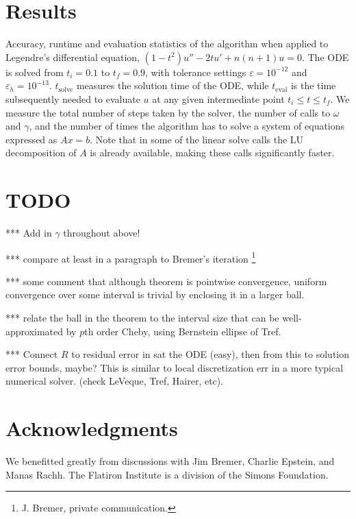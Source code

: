 \documentclass[10pt]{article}
\newcommand{\om}{\omega}
\newcommand{\g}{\gamma}
\newcommand{\Fruzsi}[1]{{\color{blue}#1}}
\begin{document}
\section{Results}

\begin{table*}
    \renewcommand{\arraystretch}{1.2}
    \Fruzsi{
    
    \caption{Accuracy, runtime and evaluation statistics of the algorithm when applied to Legendre's differential equation, $(1-t^2)u'' - 2tu' + n(n+1)u = 0.$ The ODE is solved from $t_i = 0.1$ to $t_f = 0.9$, with tolerance settings $\varepsilon = 10^{-12}$ and $\varepsilon_h = 10^{-13}$. $t_{\text{solve}}$ measures the solution time of the ODE, while $t_{\text{eval}}$ is the time subsequently needed to evaluate $u$ at any given intermediate point $t_i \leq t \leq t_f$. We measure the total number of steps taken by the solver, the number of calls to $\om$ and $\g$, and the number of times the algorithm has to solve a system of equations expressed as $Ax = b$. Note that in some of the linear solve calls the LU decomposition of $A$ is already available, making these calls significantly faster. }}
\end{table*}


\section{TODO}

*** Add in $\gamma$ throughout above!

*** compare at least in a paragraph to Bremer's iteration
\footnote{J. Bremer, private communication.}

*** some comment that although theorem is pointwise convergence,
uniform convergence over some interval is trivial by enclosing it in
a larger ball.

*** relate the ball in the theorem to the interval size that
can be well-approximated by $p$th order Cheby,
using Bernstein ellipse of Tref.

*** Connect $R$ to residual error in sat the ODE (easy),
then from this to solution error bounds, maybe?
This is similar to local discretization err
in a more typical numerical solver.
(check LeVeque, Tref, Hairer, etc).


\section*{Acknowledgments}
We benefitted greatly from discussions with Jim Bremer, Charlie Epstein,
and Manas Rachh.
The Flatiron Institute is a division of the Simons Foundation.






\end{document}
